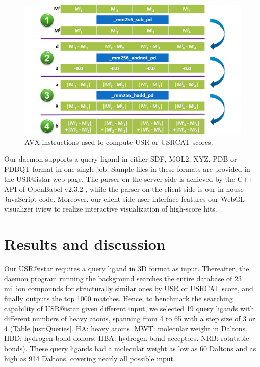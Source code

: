 \begin{figure}
\begin{center}
\includegraphics[width=\linewidth]{../usr/AVX.png}
\end{center}
\caption{AVX instructions used to compute USR or USRCAT scores.}
\label{usr:AVX}
\end{figure}

Our daemon supports a query ligand in either SDF, MOL2, XYZ, PDB or PDBQT format in one single job. Sample files in these formats are provided in the USR@istar web page. The parser on the server side is achieved by the C++ API of OpenBabel v2.3.2 \citep{968}, while the parser on the client side is our in-house JavaScript code. Moreover, our client side user interface features our WebGL visualizer iview \citep{1366} to realize interactive visualization of high-score hits.

\section{Results and discussion}

Our USR@istar requires a query ligand in 3D format as input. Thereafter, the daemon program running the background searches the entire database of 23 million compounds for structurally similar ones by USR or USRCAT score, and finally outputs the top 1000 matches. Hence, to benchmark the searching capability of USR@istar given different input, we selected 19 query ligands with different numbers of heavy atoms, spanning from 4 to 65 with a step size of 3 or 4 (Table \ref{usr:Queries}. HA: heavy atoms. MWT: molecular weight in Daltons. HBD: hydrogen bond donors. HBA: hydrogen bond acceptors. NRB: rotatable bonds). These query ligands had a molecular weight as low as 60 Daltons and as high as 914 Daltons, covering nearly all possible input.

